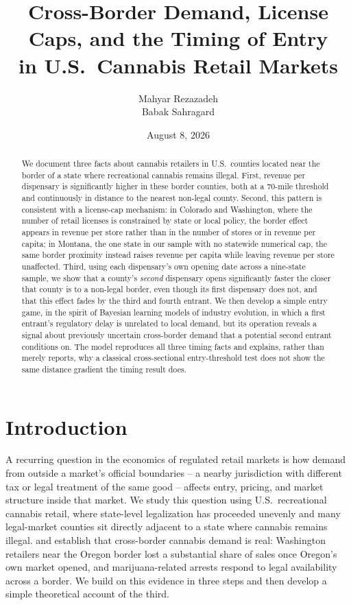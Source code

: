 \documentclass[12pt]{article}
\title{Cross-Border Demand, License Caps, and the Timing of Entry\\
in U.S.\ Cannabis Retail Markets}
\author{Mahyar Rezazadeh \\ Babak Sahragard}
\date{August 8, 2026}
\begin{document}
\maketitle

\begin{abstract}
\noindent We document three facts about cannabis retailers in U.S.\ counties located near the border of a
state where recreational cannabis remains illegal. First, revenue per dispensary is significantly higher in
these border counties, both at a 70-mile threshold and continuously in distance to the nearest non-legal
county. Second, this pattern is consistent with a license-cap mechanism: in Colorado and Washington, where
the number of retail licenses is constrained by state or local policy, the border effect appears in revenue
per store rather than in the number of stores or in revenue per capita; in Montana, the one state in our
sample with no statewide numerical cap, the same border proximity instead raises revenue per capita while
leaving revenue per store unaffected. Third, using each dispensary's own opening date across a nine-state
sample, we show that a county's \emph{second} dispensary opens significantly faster the closer that county
is to a non-legal border, even though its first dispensary does not, and that this effect fades by the third
and fourth entrant. We then develop a simple entry game, in the spirit of Bayesian learning models of
industry evolution, in which a first entrant's regulatory delay is unrelated to local demand, but its
operation reveals a signal about previously uncertain cross-border demand that a potential second entrant
conditions on. The model reproduces all three timing facts and explains, rather than merely reports, why a
classical cross-sectional entry-threshold test does not show the same distance gradient the timing result
does.
\end{abstract}

\section{Introduction}

A recurring question in the economics of regulated retail markets is how demand from outside a market's
official boundaries -- a nearby jurisdiction with different tax or legal treatment of the same good --
affects entry, pricing, and market structure inside that market. We study this question using U.S.\
recreational cannabis retail, where state-level legalization has proceeded unevenly and many legal-market
counties sit directly adjacent to a state where cannabis remains illegal. \citet{HansenMillerWeber2020} and
\citet{HaoCowan2020} establish that cross-border cannabis demand is real: Washington retailers near the
Oregon border lost a substantial share of sales once Oregon's own market opened, and marijuana-related
arrests respond to legal availability across a border. We build on this evidence in three steps and then
develop a simple theoretical account of the third.
\end{document}
